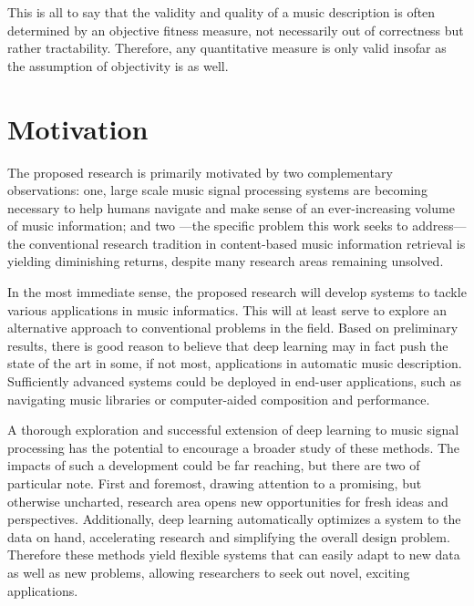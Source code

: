 This is all to say that the validity and quality of a music description is often determined by an objective fitness measure, not necessarily out of correctness but rather tractability.
Therefore, any quantitative measure is only valid insofar as the assumption of objectivity is as well.


\section{Motivation}


The proposed research is primarily motivated by two complementary observations:
one, large scale music signal processing systems are becoming necessary to help humans navigate and make sense of an ever-increasing volume of music information;
and two ---the specific problem this work seeks to address--- the conventional research tradition in content-based music information retrieval is yielding diminishing returns, despite many research areas remaining unsolved.

In the most immediate sense, the proposed research will develop systems to tackle various applications in music informatics.
This will at least serve to explore an alternative approach to conventional problems in the field.
Based on preliminary results, there is good reason to believe that deep learning may in fact push the state of the art in some, if not most, applications in automatic music description.
Sufficiently advanced systems could be deployed in end-user applications, such as navigating music libraries or computer-aided composition and performance.

A thorough exploration and successful extension of deep learning to music signal processing has the potential to encourage a broader study of these methods.
The impacts of such a development could be far reaching, but there are two of particular note.
First and foremost, drawing attention to a promising, but otherwise uncharted, research area opens new opportunities for fresh ideas and perspectives.
Additionally, deep learning automatically optimizes a system to the data on hand, accelerating research and simplifying the overall design problem.
Therefore these methods yield flexible systems that can easily adapt to new data as well as new problems, allowing researchers to seek out novel, exciting applications.

